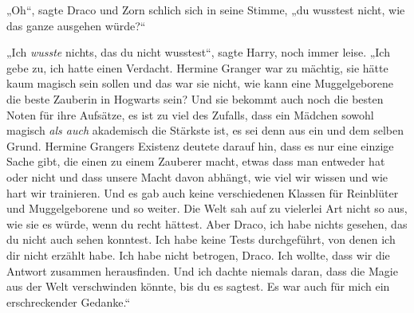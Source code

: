 „Oh“, sagte Draco und Zorn schlich sich in seine Stimme, „du wusstest nicht, wie das ganze ausgehen würde?“

„Ich \emph{wusste} nichts, das du nicht wusstest“, sagte Harry, noch immer leise. „Ich gebe zu, ich hatte einen Verdacht. Hermine Granger war zu mächtig, sie hätte kaum magisch sein sollen und das war sie nicht, wie kann eine Muggelgeborene die beste Zauberin in Hogwarts sein? Und sie bekommt auch noch die besten Noten für ihre Aufsätze, es ist zu viel des Zufalls, dass ein Mädchen sowohl magisch \emph{als auch} akademisch die Stärkste ist, es sei denn aus ein und dem selben Grund. Hermine Grangers Existenz deutete darauf hin, dass es nur eine einzige Sache gibt, die einen zu einem Zauberer macht, etwas dass man entweder hat oder nicht und dass unsere Macht davon abhängt, wie viel wir wissen und wie hart wir trainieren. Und es gab auch keine verschiedenen Klassen für Reinblüter und Muggelgeborene und so weiter. Die Welt sah auf zu vielerlei Art nicht so aus, wie sie es würde, wenn du recht hättest. Aber Draco, ich habe nichts gesehen, das du nicht auch sehen konntest. Ich habe keine Tests durchgeführt, von denen ich dir nicht erzählt habe. Ich habe nicht betrogen, Draco. Ich wollte, dass wir die Antwort zusammen herausfinden. Und ich dachte niemals daran, dass die Magie aus der Welt verschwinden könnte, bis du es sagtest. Es war auch für mich ein erschreckender Gedanke.“

